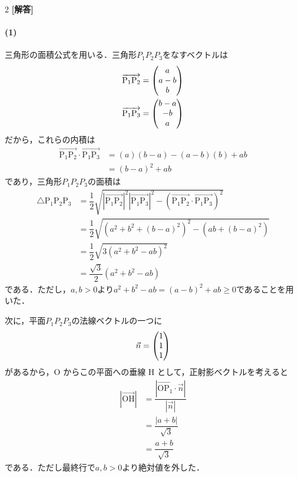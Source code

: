 \documentclass[../../main.tex]{subfiles}
\begin{document}
\setcounter{equation}{0}
\begin{oframed}
  
\end{oframed}
\setlength{\columnseprule}{0.4pt}
\begin{multicols}{2}
  {\bf [解答]}

  \paragraph{(1)}
  三角形の面積公式を用いる．三角形$P_1P_2P_3$をなすベクトルは
  \begin{align}
    \overrightarrow{\text{P}_1\text{P}_2} = \mqty( a  \\ a-b \\ b ) \\
    \overrightarrow{\text{P}_1\text{P}_3} = \mqty(b-a \\ -b \\ a)
  \end{align}
  だから，これらの内積は
  \begin{align}
    \overrightarrow{\text{P}_1\text{P}_2} \cdot \overrightarrow{\text{P}_1\text{P}_3}
    & = (a)(b-a) - (a-b)(b) + ab \\
    & = (b-a)^2 + ab
  \end{align}
  であり，三角形$P_1P_2P_3$の面積は
  \begin{align}
    \triangle \text{P}_1\text{P}_2\text{P}_3
    & = \dfrac{1}{2} \sqrt{|\overrightarrow{\text{P}_1\text{P}_2}|^2 |\overrightarrow{\text{P}_1\text{P}_3}|^2 - (\overrightarrow{\text{P}_1\text{P}_2} \cdot \overrightarrow{\text{P}_1\text{P}_3})^2} \\
    & = \dfrac{1}{2} \sqrt{\left(a^2+b^2+(b-a)^2\right)^2 - \left(ab+(b-a)^2\right)}                                                                        \\
    & = \dfrac{1}{2} \sqrt{3(a^2+b^2-ab)^2}                                                                                                                 \\
    & = \dfrac{\sqrt{3}}{2} \left(a^2+b^2-ab\right)
  \end{align}
  である．ただし，$a,b>0$より$a^2+b^2-ab=(a-b)^2+ab\ge 0$であることを用いた．

  次に，平面$P_1P_2P_3$の法線ベクトルの一つに
  \begin{align}
    \vec{n} = \mqty(1 \\ 1 \\ 1 )
  \end{align}
  があるから，O からこの平面への垂線 H として，正射影ベクトルを考えると
  \begin{align}
    |\overrightarrow{\text{OH}}|
    & = \dfrac{|\overrightarrow{\text{OP}_1} \cdot \vec{n}|}{|\vec{n}|} \\
    & = \dfrac{|a+b|}{\sqrt{3}}                              \\
    & = \dfrac{a+b}{\sqrt{3}}
  \end{align}
  である．ただし最終行で$a,b>0$より絶対値を外した．


\end{multicols}
\end{document}
